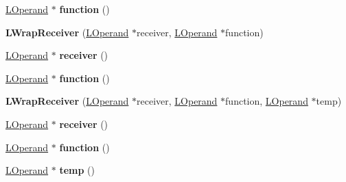 \begin{DoxyCompactItemize}
\item 
\hyperlink{classv8_1_1internal_1_1_l_operand}{L\+Operand} $\ast$ {\bfseries function} ()\hypertarget{classv8_1_1internal_1_1_l_wrap_receiver_a95dc5af2b6137222026b758f3e4ad900}{}\label{classv8_1_1internal_1_1_l_wrap_receiver_a95dc5af2b6137222026b758f3e4ad900}

\item 
{\bfseries L\+Wrap\+Receiver} (\hyperlink{classv8_1_1internal_1_1_l_operand}{L\+Operand} $\ast$receiver, \hyperlink{classv8_1_1internal_1_1_l_operand}{L\+Operand} $\ast$function)\hypertarget{classv8_1_1internal_1_1_l_wrap_receiver_a24ab2d52e58cf666d31ead0c3d0df61d}{}\label{classv8_1_1internal_1_1_l_wrap_receiver_a24ab2d52e58cf666d31ead0c3d0df61d}

\item 
\hyperlink{classv8_1_1internal_1_1_l_operand}{L\+Operand} $\ast$ {\bfseries receiver} ()\hypertarget{classv8_1_1internal_1_1_l_wrap_receiver_ac4f23b016adecc0eec8dc29d7607f486}{}\label{classv8_1_1internal_1_1_l_wrap_receiver_ac4f23b016adecc0eec8dc29d7607f486}

\item 
\hyperlink{classv8_1_1internal_1_1_l_operand}{L\+Operand} $\ast$ {\bfseries function} ()\hypertarget{classv8_1_1internal_1_1_l_wrap_receiver_a95dc5af2b6137222026b758f3e4ad900}{}\label{classv8_1_1internal_1_1_l_wrap_receiver_a95dc5af2b6137222026b758f3e4ad900}

\item 
{\bfseries L\+Wrap\+Receiver} (\hyperlink{classv8_1_1internal_1_1_l_operand}{L\+Operand} $\ast$receiver, \hyperlink{classv8_1_1internal_1_1_l_operand}{L\+Operand} $\ast$function, \hyperlink{classv8_1_1internal_1_1_l_operand}{L\+Operand} $\ast$temp)\hypertarget{classv8_1_1internal_1_1_l_wrap_receiver_ae6268c10afa00ced369a515c342138c6}{}\label{classv8_1_1internal_1_1_l_wrap_receiver_ae6268c10afa00ced369a515c342138c6}

\item 
\hyperlink{classv8_1_1internal_1_1_l_operand}{L\+Operand} $\ast$ {\bfseries receiver} ()\hypertarget{classv8_1_1internal_1_1_l_wrap_receiver_ac4f23b016adecc0eec8dc29d7607f486}{}\label{classv8_1_1internal_1_1_l_wrap_receiver_ac4f23b016adecc0eec8dc29d7607f486}

\item 
\hyperlink{classv8_1_1internal_1_1_l_operand}{L\+Operand} $\ast$ {\bfseries function} ()\hypertarget{classv8_1_1internal_1_1_l_wrap_receiver_a95dc5af2b6137222026b758f3e4ad900}{}\label{classv8_1_1internal_1_1_l_wrap_receiver_a95dc5af2b6137222026b758f3e4ad900}

\item 
\hyperlink{classv8_1_1internal_1_1_l_operand}{L\+Operand} $\ast$ {\bfseries temp} ()\hypertarget{classv8_1_1internal_1_1_l_wrap_receiver_a276ec76bf254f4afe86140aec5a7a0f0}{}\label{classv8_1_1internal_1_1_l_wrap_receiver_a276ec76bf254f4afe86140aec5a7a0f0}

\end{DoxyCompactItemize}
